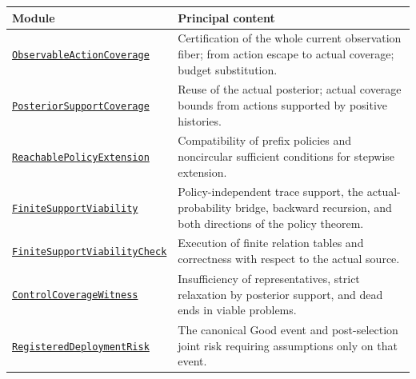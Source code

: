 \documentclass[
  english,
  11pt,
  oneside]{book}
\newcounter{none} %
\begin{document}
{\def\LTcaptype{none} %
\begin{longtable}[]{@{}
  >{\raggedright\arraybackslash}p{}
  >{\raggedright\arraybackslash}p{}@{}}
\toprule\noalign{}
\begin{minipage}[b]{\linewidth}\raggedright
Module
\end{minipage} & \begin{minipage}[b]{\linewidth}\raggedright
Principal content
\end{minipage} \\
\midrule\noalign{}
\endhead
\bottomrule\noalign{}
\endlastfoot
\href{../formalization/ueot-core/UEOT/V3/Compression/TheoryCompletion/UnifiedClosure/ObservableActionCoverage.lean}{\nolinkurl{ObservableActionCoverage}} & Certification of the whole current observation fiber; from action escape to actual coverage; budget substitution. \\
\href{../formalization/ueot-core/UEOT/V3/Compression/TheoryCompletion/UnifiedClosure/PosteriorSupportCoverage.lean}{\nolinkurl{PosteriorSupportCoverage}} & Reuse of the actual posterior; actual coverage bounds from actions supported by positive histories. \\
\href{../formalization/ueot-core/UEOT/V3/Compression/TheoryCompletion/UnifiedClosure/ReachablePolicyExtension.lean}{\nolinkurl{ReachablePolicyExtension}} & Compatibility of prefix policies and noncircular sufficient conditions for stepwise extension. \\
\href{../formalization/ueot-core/UEOT/V3/Compression/TheoryCompletion/UnifiedClosure/FiniteSupportViability.lean}{\nolinkurl{FiniteSupportViability}} & Policy-independent trace support, the actual-probability bridge, backward recursion, and both directions of the policy theorem. \\
\href{../formalization/ueot-core/UEOT/V3/Compression/TheoryCompletion/UnifiedClosure/FiniteSupportViabilityCheck.lean}{\nolinkurl{FiniteSupportViabilityCheck}} & Execution of finite relation tables and correctness with respect to the actual source. \\
\href{../formalization/ueot-core/UEOT/V3/Compression/TheoryCompletion/UnifiedClosure/ControlCoverageWitness.lean}{\nolinkurl{ControlCoverageWitness}} & Insufficiency of representatives, strict relaxation by posterior support, and dead ends in viable problems. \\
\href{../formalization/ueot-core/UEOT/V3/Compression/TheoryCompletion/UnifiedClosure/RegisteredDeploymentRisk.lean}{\nolinkurl{RegisteredDeploymentRisk}} & The canonical Good event and post-selection joint risk requiring assumptions only on that event. \\

\end{longtable}}
\end{document}
